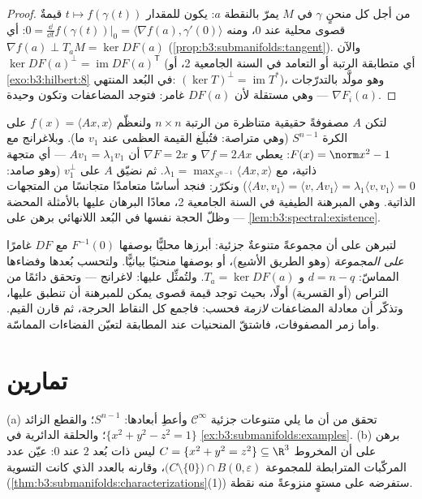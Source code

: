 \begin{proof}
من أجل كل منحنٍ $\gamma$ في $M$ يمرّ بالنقطة $a$: يكون للمقدار
$t \mapsto
f(\gamma(t))$ قيمةٌ قصوى محلية عند $0$، ومنه $0 =
\frac{\dd}{\dd t}f(\gamma(t))\big|_0 = \langle\nabla f(a),
\gamma'(0)\rangle$: أي $\nabla f(a) \perp T_aM = \ker DF(a)$
(\cref{prop:b3:submanifolds:tangent}). والآن $\ker DF(a)^\perp
= \operatorname{im}DF(a)^{\mathsf T}$ (أي متطابقة الرتبة أو التعامد في
السنة الجامعية 2، أو \cref{exo:b3:hilbert:8} في البُعد المنتهي: $(\ker T)^\perp = \operatorname{im}T^*$)،
وهو مولَّد بالتدرّجات $\nabla F_i(a)$ --- وهي مستقلة لأن
$DF(a)$ غامر: فتوجد المضاعفات وتكون وحيدة.
\end{proof}

\begin{example}
\label{ex:b3:submanifolds:rayleigh}
لتكن $A$ مصفوفةً حقيقية متناظرة من الرتبة $n\times n$ ولنعظّم
$f(x) = \langle Ax, x\rangle$ على الكرة $S^{n-1}$ (وهي متراصة: فتُبلَغ القيمة العظمى
عند $v_1$ ما). وبلاغرانج مع $F(x) = \norm x^2 - 1$: يعطي $\nabla f = 2Ax$
و $\nabla F =
2x$ أن $Av_1 = \lambda_1v_1$ --- أي متجهة ذاتية، مع $\lambda_1 = \max_{S^{n-1}}\langle Ax, x\rangle$. ثم نضيّق
$A$ على $v_1^\perp$ (وهو صامد: $\langle Av, v_1\rangle =
\langle v, Av_1\rangle = \lambda_1\langle v, v_1\rangle = 0$) ونكرّر: فنجد أساسًا
متعامدًا متجانسًا من المتجهات الذاتية. وهي المبرهنة الطيفية في
السنة الجامعية 2، معادًا البرهان عليها بالأمثلة المحضة --- وظلّ
الحجة نفسها في البُعد اللانهائي برهن على \cref{lem:b3:spectral:existence}.
\end{example}

\begin{method}\label{met:b3:submanifolds:method}
لتبرهن على أن مجموعةً متنوعةٌ جزئية: أبرزها محليًّا بوصفها
$F^{-1}(0)$ مع $DF$ غامرًا \emph{على المجموعة} (وهو الطريق
الأشيع)، أو بوصفها منحنيًا بيانيًّا. ولتحسب بُعدها وفضاءها
المماسّ: $d = n - q$ و $T_a = \ker DF(a)$. ولتُمثِّل عليها: لاغرانج ---
وتحقق دائمًا من التراص (أو القسرية) أولًا، بحيث توجد قيمة قصوى
يمكن للمبرهنة أن تنطبق عليها، وتذكّر أن معادلة المضاعفات
\emph{لازمة} فحسب: فاجمع كل النقاط الحرجة، ثم قارن القيم. وأما
زمر المصفوفات، فاشتقّ المنحنيات عند المطابقة لتعيّن الفضاءات
المماسّة.
\end{method}

\section{تمارين}

\begin{exercise}[$\star$]\label{exo:b3:submanifolds:1}
(a) تحقق من أن ما يلي متنوعات جزئية $\mathcal C^\infty$ وأعطِ أبعادها:
$S^{n-1}$؛ والقطع الزائد $\{x^2 + y^2 - z^2 = 1\}$؛ والحلقة الدائرية في
\cref{ex:b3:submanifolds:examples}.
(b) برهن على أن المخروط $C = \{x^2 + y^2 = z^2\} \subseteq
\R^3$ ليس  ذات بُعد $2$
عند $0$: عيّن عدد المركّبات المترابطة للمجموعة $\bigl(C\setminus\{0\}\bigr)\cap B(0,\varepsilon)$، وقارنه
بالعدد الذي كانت التسوية (\cref{thm:b3:submanifolds:characterizations}(1)) ستفرضه على مستوٍ
منزوعةً منه نقطة.
\end{exercise}

